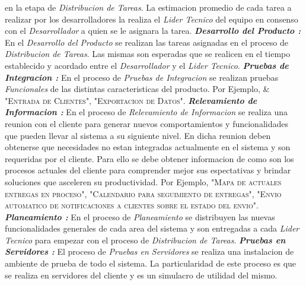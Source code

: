 \documentclass[
10pt, %
a4paper, %
oneside, %
headinclude,footinclude, %
BCOR5mm, %
]{scrartcl}
\begin{document}
\begin{flushleft}
  en la etapa de \textit{Distribucion de Tareas}. La estimacion promedio de
  cada  tarea a realizar por los desarrolladores la realiza el
  \textit{Lider Tecnico} del equipo en consenso con el \textit{Desarrollador}
  a quien se le asignara la tarea.
  \newline  \newline
  \textbf{ \emph{Desarrollo del Producto : } } En el \textit{Desarrollo del Producto}
  se realizan las tareas asignadas en el proceso de \textit{Distribucion de Tareas}.
  Las mismas son esperadas que se realicen en el tiempo establecido y acordado
  entre el \textit{Desarrollador} y el \textit{Lider Tecnico}.
  \newline  \newline
  \textbf{ \emph{Pruebas de Integracion : } } En el proceso de
  \textit{Pruebas de Integracion} se realizan pruebas \emph{Funcionales} de
  las distintas caracteristicas del producto. Por Ejemplo,
  \newline
  \& "\textsc{Entrada de Clientes}", "\textsc{Exportacion de Datos}".
\pagebreak
  \textbf{ \emph{Relevamiento de Informacion : } } En el proceso de
  \textit{Relevamiento de Informacion} se realiza una reunion con el cliente
  para generar nuevos comportamientos y funcionalidades que pueden llevar al
  sistema a su siguiente nivel. En dicha reunion deben obtenerse que necesidades
  no estan integradas actualmente en el sistema y son requeridas por el cliente.
  Para ello se debe obtener informacion de como son los procesos actuales del
  cliente para comprender mejor sus espectativas y brindar soluciones que
  asceleren su productividad.
  Por Ejemplo,
  "\textsc{Mapa de actuales entregas en proceso}",
  "\textsc{Calendario para seguimiento de entregas}",
  "\textsc{Envio automatico de notificaciones a clientes sobre el estado del envio}".
  \newline  \newline
  \textbf{ \emph{Planeamiento : } } En el proceso de \textit{Planeamiento} se
  distribuyen las nuevas funcionalidades generales de cada area del sistema y
  son entregadas a cada \textit{Lider Tecnico} para empezar con el proceso de
  \textit{Distribucion de Tareas}.
  \newline  \newline
  \textbf{ \emph{Pruebas en Servidores : } } El proceso de
  \textit{Pruebas en Servidores} se realiza una instalacion de ambiente
  de prueba de todo el sistema. La particularidad de este proceso es que
  se realiza en servidores del cliente y es un simulacro de utilidad del mismo.

\end{flushleft}
\end{document}
